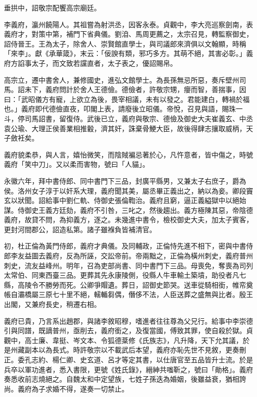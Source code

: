 \begin{pinyinscope}
 垂拱中，詔敬宗配饗高宗廟廷。



 李義府，瀛州饒陽人。其祖嘗為射洪丞，因客永泰。貞觀中，李大亮巡察劍南，表義府才，對策中第，補門下省典儀。劉洎、馬周更薦之，太宗召見，轉監察御史，詔侍晉王。王為太子，除舍人、崇賢館直學士，與司議郎來濟俱以文翰顯，時稱「來李」。獻《承華箴》，末云：「佞諛有類，邪巧多方。其萌不絕，其害必彰。」義府方諂事太子，而文致若讜直者，太子表之，優詔賜帛。



 高宗立，遷中書舍人，兼修國史，進弘文館學士。為長孫無忌所惡，奏斥壁州司馬。詔未下，義府問計於舍人王德儉。德儉者，許敬宗甥，癭而智，善揣事，因曰：「武昭儀方有寵，上欲立為後，畏宰相議，未有以發之。君能建白，轉禍於福也。」義府即代德儉直夜，叩閣上表，請廢後立昭儀。帝悅，召見與語，賜珠一斗，停司馬詔書，留復侍。武後已立，義府與敬宗、德儉及御史大夫崔義玄、中丞袁公瑜、大理正侯善業相推轂，濟其奸，誅棄骨鯁大臣，故後得肆志攘取威柄，天子斂衽矣。



 義府貌柔恭，與人言，嬉怡微笑，而陰賊褊忌著於心，凡忤意者，皆中傷之，時號義府「笑中刀」。又以柔而害物，號曰「人貓」。



 永徽六年，拜中書侍郎、同中書門下三品，封廣平縣男，又兼太子右庶子，爵為侯。洛州女子淳于以奸系大理，義府聞其美，屬丞畢正義出之，納以為妾。卿段竇玄以狀聞。詔給事中劉仁軌、侍御史張倫鞫治。義府且窮，逼正義縊獄中以絕始謀。侍御史王義方廷劾，義府不引咎，三叱之，然後趨出。義方極陳其惡，帝陰德義府，故貸不問，為抑義方，逐之。未幾進中書令，檢校御史大夫，加太子賓客，更封河間郡公，詔造私第。諸子雖褓負皆補清官。



 初，杜正倫為黃門侍郎，義府才典儀。及同輔政，正倫恃先進不相下，密與中書侍郎李友益圖去義府，反為所誣，交訟帝前。帝兩黜之，正倫為橫州刺史，義府普州刺史，流友益峰州。明年，召為吏部尚書、同中書門下三品。母喪免，奪喪為司列太常伯、同東西臺三品。更葬其先永康陵側，役縣人牛車輸土築墳，助役者凡七縣，高陵令不勝勞而死。公卿爭賵遺。葬日，詔御史節哭。送車從騎相銜，帷帟奠帳自灞橋屬三原七十里不絕，轜輴芻偶，僭侈不法，人臣送葬之盛無與比者。殷王出閣，又兼府長史，稍遷右相。



 義府已貴，乃言系出趙郡，與諸李敘昭穆，嗜進者往往尊為父兄行。給事中李崇德引與同譜，既謫普州，亟削去，義府銜之，及復當國，傅致其罪，使自殺於獄。貞觀中，高士廉、韋挺、岑文本、令狐德棻修《氏族志》，凡升降，天下允其議，於是州藏副本以為長式。時許敬宗以不載武后本望，義府亦恥先世不見敘，更奏刪正。委孔志約、楊仁卿、史玄道、呂才等定其書，以仕唐官至五品皆升士流。於是兵卒以軍功進者，悉入書限，更號《姓氏錄》，縉紳共嗤靳之，號曰「勛格」。義府奏悉收前志燒絕之。自魏太和中定望族，七姓子孫迭為婚姻，後雖益衰，猶相誇尚。義府為子求婚不得，遂奏一切禁止。




\end{pinyinscope}

